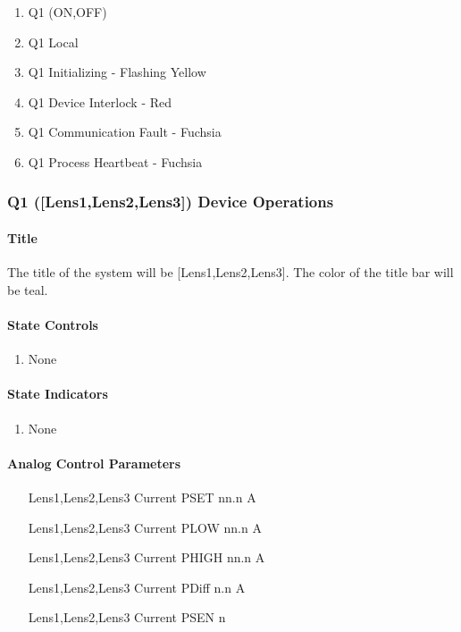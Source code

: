 \documentclass[11pt]{book}		%
\begin{document}
\begin{enumerate}
 \item Q1 (ON,OFF)
 \item Q1 Local
 \item Q1 Initializing - Flashing Yellow
 \item Q1 Device Interlock - Red
 \item Q1 Communication Fault - Fuchsia
 \item Q1 Process Heartbeat - Fuchsia
\end{enumerate}

\subsubsection{Q1 ([Lens1,Lens2,Lens3]) Device Operations} \label{sect:cyc-op-interface-ops-terminal-device-ops-q1}

\paragraph{Title} \label{sect:cyc-op-interface-ops-terminal-device-ops-q1-title}

The title of the system will be [Lens1,Lens2,Lens3].  The color of the title bar will be teal.

\paragraph{State Controls}

\begin{enumerate}
\item None
\end{enumerate}

\paragraph{State Indicators}

\begin{enumerate}
 \item None
\end{enumerate}

\paragraph{Analog Control Parameters}

\begin{enumerate}
 \item [Lens1,Lens2,Lens3] Current PSET   nn.n A
 \item [Lens1,Lens2,Lens3] Current PLOW   nn.n A
 \item [Lens1,Lens2,Lens3] Current PHIGH  nn.n A
 \item [Lens1,Lens2,Lens3] Current PDiff n.n A
 \item [Lens1,Lens2,Lens3] Current PSEN  n
\end{enumerate}
\end{document}
